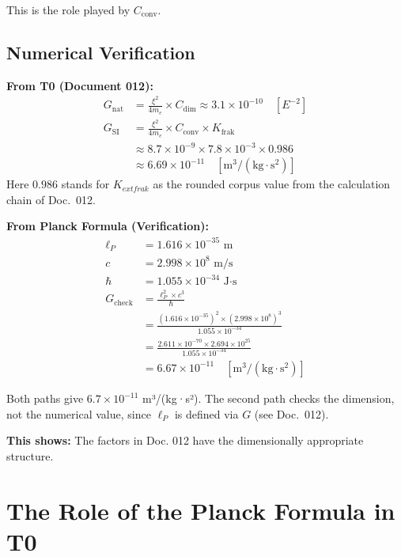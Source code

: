 	This is the role played by $C_{\text{conv}}$.
	
	\subsection{Numerical Verification}
	
	\begin{verification}
		\textbf{From T0 (Document 012):}
		\begin{align}
			G_{\text{nat}} &= \frac{\xi^2}{4m_e} \times C_{\text{dim}} \approx 3.1 \times 10^{-10} \quad [E^{-2}] \\
			G_{\text{SI}} &= \frac{\xi^2}{4m_e} \times C_{\text{conv}} \times K_{\text{frak}} \\
			&\approx 8.7 \times 10^{-9} \times 7.8 \times 10^{-3} \times 0.986 \\
			&\approx 6.69 \times 10^{-11} \quad [\text{m}^3/(\text{kg} \cdot \text{s}^2)]
		\end{align}
		Here $0.986$ stands for $K_{	ext{frak}}$ as the rounded corpus value from the calculation chain of Doc.~012.
		
		
		\textbf{From Planck Formula (Verification):}
		\begin{align}
			\ell_P &= 1.616 \times 10^{-35} \text{ m} \\
			c &= 2.998 \times 10^8 \text{ m/s} \\
			\hbar &= 1.055 \times 10^{-34} \text{ J·s} \\
			G_{\text{check}} &= \frac{\ell_P^2 \times c^3}{\hbar} \\
			&= \frac{(1.616 \times 10^{-35})^2 \times (2.998 \times 10^8)^3}{1.055 \times 10^{-34}} \\
			&= \frac{2.611 \times 10^{-70} \times 2.694 \times 10^{25}}{1.055 \times 10^{-34}} \\
			&= 6.67 \times 10^{-11} \quad [\text{m}^3/(\text{kg} \cdot \text{s}^2)]
		\end{align}
		
		Both paths give $6.7 \times 10^{-11}$ m³/(kg·s²). The second path checks the dimension, not the numerical value, since $\ell_P$ is defined via $G$ (see Doc.~012).
		
		\textbf{This shows:} The factors in Doc. 012 have the dimensionally appropriate structure.
	\end{verification}
	
	\section{The Role of the Planck Formula in T0}
	
